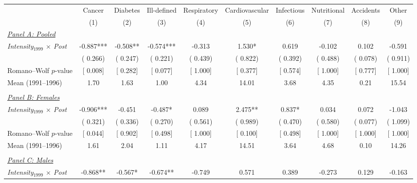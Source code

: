 \begin{tabular}{l*{9}{c}} \hline \hline
& Cancer & Diabetes & Ill-defined & Respiratory & Cardiovascular & Infectious & Nutritional & Accidents & Other \\ 
& \multicolumn{1}{c}{(1)} & \multicolumn{1}{c}{(2)} & \multicolumn{1}{c}{(3)} & \multicolumn{1}{c}{(4)} & \multicolumn{1}{c}{(5)} & \multicolumn{1}{c}{(6)} & \multicolumn{1}{c}{(7)} & \multicolumn{1}{c}{(8)} & \multicolumn{1}{c}{(9)} \\ \toprule
\underline{\textit{Panel A: Pooled}} \\ 
\textit{Intensity$_{1999}$ $\times$ Post} &       -0.887*** &       -0.508** &       -0.574*** &       -0.313 &        1.530* &        0.619 &       -0.102 &        0.102 &       -0.591 \\ 
 & (       0.266) & (       0.247) & (       0.221) & (       0.439) & (       0.822) & (       0.392) & (       0.488) & (       0.078) & (       0.911) \\ 
Romano--Wolf $p$-value & [ 0.008] & [ 0.282] & [ 0.077] & [ 1.000] & [ 0.377] & [ 0.574] & [ 1.000] & [ 0.777] & [ 1.000] \\ 
Mean (1991--1996) &         1.70 &         1.63 &         1.00 &         4.34 &        14.01 &         3.68 &         4.35 &         0.21 &        15.54 \\ 
  & & & & & & & & & \\ 
\underline{\textit{Panel B: Females}} \\ 
\textit{Intensity$_{1999}$ $\times$ Post} &       -0.906*** &       -0.451 &       -0.487* &        0.089 &        2.475** &        0.837* &        0.034 &        0.072 &       -1.043 \\ 
 & (       0.321) & (       0.336) & (       0.270) & (       0.561) & (       0.989) & (       0.470) & (       0.580) & (       0.077) & (       1.099) \\ 
Romano--Wolf $p$-value & [ 0.044] & [ 0.902] & [ 0.498] & [ 1.000] & [ 0.100] & [ 0.498] & [ 1.000] & [ 1.000] & [ 1.000] \\ 
Mean (1991--1996) &         1.61 &         2.04 &         1.11 &         4.17 &        14.51 &         3.64 &         4.68 &         0.10 &        14.26 \\ 
  & & & & & & & & & \\ 
\underline{\textit{Panel C: Males}} \\ 
\textit{Intensity$_{1999}$ $\times$ Post} &       -0.868** &       -0.567* &       -0.674** &       -0.749 &        0.571 &        0.389 &       -0.273 &        0.129 &       -0.163 \\ 

\end{tabular}
